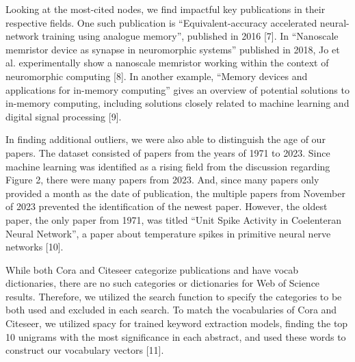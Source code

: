 \documentclass[conference]{IEEEtran}
\begin{document}
Looking at the most-cited nodes, we find impactful key publications 
in their respective fields. One such publication is “Equivalent-accuracy 
accelerated neural-network training using analogue memory”, published in 2016 [7]. 
In “Nanoscale memristor device as synapse in neuromorphic systems'' published 
in 2018,  Jo et al. experimentally show a nanoscale memristor working within 
the context of neuromorphic computing [8]. In another example, “Memory devices 
and applications for in-memory computing” gives an overview of potential solutions 
to in-memory computing, including solutions closely related to machine learning and 
digital signal processing [9]. \par

In finding additional outliers, we were also able to distinguish the age of our papers. 
The dataset consisted of papers from the years of 1971 to 2023. Since machine 
learning was identified as a rising field from the discussion regarding Figure 2, 
there were many papers from 2023. And, since many papers only provided a month as 
the date of publication, the multiple papers from November of 2023 prevented the 
identification of the newest paper. However, the oldest paper, the only paper from 
1971, was titled “Unit Spike Activity in Coelenteran Neural Network”, a paper about 
temperature spikes in primitive neural nerve networks [10]. \par

While both Cora and Citeseer categorize publications and have vocab dictionaries, 
there are no such categories or dictionaries for Web of Science results. 
Therefore, we utilized the search function to specify the categories to be 
both used and excluded in each search. To match the vocabularies of Cora and 
Citeseer, we utilized spacy for trained keyword extraction models, finding 
the top 10 unigrams with the most significance in each abstract, and used 
these words to construct our vocabulary vectors [11]. \par
\end{document}
